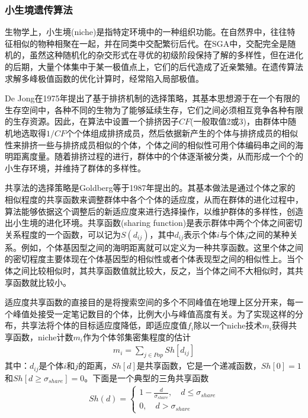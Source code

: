         \subsubsection{小生境遗传算法}
            \par
            生物学上，小生境(niche)是指特定环境中的一种组织功能。在自然界中，往往特征相似的物种相聚在一起，并在同类中交配繁衍后代。在SGA中，交配完全是随机的，虽然这种随机化的杂交形式在寻优的初级阶段保持了解的多样性，但在进化的后期，大量个体集中于某一极值点上，它们的后代造成了近亲繁殖。在遗传算法求解多峰极值函数的优化计算时，经常陷入局部极值。
            \par
            De Jong在1975年提出了基于排挤机制的选择策略，其基本思想源于在一个有限的生存空间中，各种不同的生物为了能够延续生存，它们之间必须相互竞争各种有限的生存资源。因此，在算法中设置一个排挤因子$CF$(一般取值2或3)，由群体中随机地选取得$1/CF$个个体组成排挤成员，然后依据新产生的个体与排挤成员的相似性来排挤一些与排挤成员相似的个体，个体之间的相似性可用个体编码串之间的海明距离度量。随着排挤过程的进行，群体中的个体逐渐被分类，从而形成一个个的小生存环境，并维持了群体的多样性。
            \par
            共享法的选择策略是Goldberg等于1987年提出的。其基本做法是通过个体之家的相似程度的共享函数来调整群体中各个个体的适应度，从而在群体的进化过程中，算法能够依据这个调整后的新适应度来进行选择操作，以维护群体的多样性，创造出小生境的进化环境。共享函数(sharing function)是表示群体中两个个体之间密切关系程度的一个函数，可以记为$S(d_{ij})$，其中$d_{ij}$表示个体$i$与个体$j$之间的某种关系。例如，个体基因型之间的海明距离就可以定义为一种共享函数。这里个体之间的密切程度主要体现在个体基因型的相似性或者个体表现型之间的相似性上。当个体之间比较相似时，其共享函数值就比较大，反之，当个体之间不大相似时，其共享函数就比较小。
            \par
            适应度共享函数的直接目的是将搜索空间的多个不同峰值在地理上区分开来，每一个峰值处接受一定笔记数目的个体，比例大小与峰值高度有关。为了实现这样的分布，共享法将个体的目标适应度降低，即适应度值$f_i$除以一个niche技术$m_i$获得共享函数，niche计数$m_i$作为个体邻集密集程度的估计
            \begin{align*}
            m_i = \sum_{j\in Pop} Sh[d_{ij}]
            \end{align*}
            其中：$d_{ij}$是个体$i$和$j$的距离，$Sh[d]$是共享函数，它是一个递减函数，$Sh[0] = 1$和$Sh[d \geqslant \sigma_{share} ]= 0$。下面是一个典型的三角共享函数
            \begin{align*}
            Sh(d) =
            \left\{
            \begin{aligned}
            1-\frac{d}{\sigma_{share}}, \quad d \leqslant \sigma_{share}\\
            0 ,\quad d >\sigma_{share}
            \end{aligned}
            \right.
            \end{align*}
